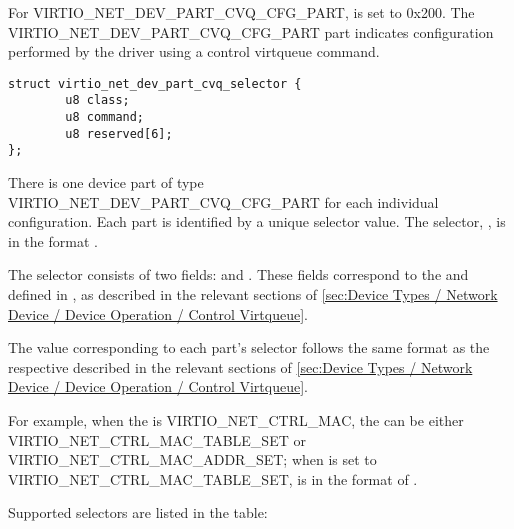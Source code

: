 For VIRTIO_NET_DEV_PART_CVQ_CFG_PART,  is set to 0x200. The
VIRTIO_NET_DEV_PART_CVQ_CFG_PART part indicates configuration performed by the
driver using a control virtqueue command.

\begin{lstlisting}
struct virtio_net_dev_part_cvq_selector {
        u8 class;
        u8 command;
        u8 reserved[6];
};
\end{lstlisting}

There is one device part of type VIRTIO_NET_DEV_PART_CVQ_CFG_PART for each
individual configuration. Each part is identified by a unique selector value.
The selector, , is in the format
.

The selector consists of two fields:  and . These
fields correspond to the  and  defined in
, as described in the relevant sections of
\ref{sec:Device Types / Network Device / Device Operation / Control Virtqueue}.

The value corresponding to each part’s selector follows the same format as the
respective  described in the relevant sections of
\ref{sec:Device Types / Network Device / Device Operation / Control Virtqueue}.

For example, when the  is VIRTIO_NET_CTRL_MAC, the 
can be either VIRTIO_NET_CTRL_MAC_TABLE_SET or VIRTIO_NET_CTRL_MAC_ADDR_SET;
when  is set to VIRTIO_NET_CTRL_MAC_TABLE_SET, 
is in the format of .

Supported selectors are listed in the table:

